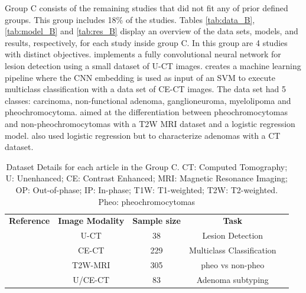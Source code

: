 \documentclass{article}
\begin{document}
Group C consists of the remaining studies that did not fit any of prior defined
groups.  This group includes 18\% of the studies. Tables \ref{tab:data_B},
\ref{tab:model_B} and \ref{tab:res_B} display an overview of the data sets,
models, and results, respectively, for each study inside group C. In this group
are 4 studies with distinct objectives. \cite{Bi2017} implements a fully
convolutional neural network for lesion detection using a small dataset of U-CT
images. \cite{Bi2022} creates a machine learning pipeline where the CNN
embedding is used as input of an SVM to execute multiclass classification with a
data set of CE-CT images. The data set had 5 classes: carcinoma, non-functional
adenoma, ganglioneuroma, myelolipoma and pheochromocytoma.\cite{Kong2022} aimed
at the differentiation between pheochromocytomas and non-pheochromocytomas with
a T2W MRI dataset and a logistic regression model. \cite{Zheng2020} also used
logistic regression but to characterize adenomas with a CT dataset.
\begin{table}[]
    \centering
    \begin{tabular}{ccccc}\toprule
        \multirow{2}{*}{\textbf{Reference}} & \multirow{2}{*}{\textbf{Image Modality}} & \multirow{2}{*}{\textbf{Sample size}} & \multirow{2}{*}{\textbf{Task}} \\
        \\ \midrule
        \cite{Bi2017}                       & U-CT                                     & 38                                    & Lesion Detection               \\
        \cite{Bi2022}                       & CE-CT                                    & 229                                   & Multiclass Classification      \\
        \cite{Kong2022}                     & T2W-MRI                                  & 305                                   & pheo vs non-pheo               \\
        \cite{Zheng2020}                    & U/CE-CT                                  & 83                                    & Adenoma subtyping              \\
        \bottomrule
    \end{tabular}
    \caption{Dataset Details for each article in the Group C. CT: Computed Tomography; U: Unenhanced; CE: Contrast Enhanced; MRI: Magnetic Resonance Imaging; OP: Out-of-phase; IP: In-phase; T1W: T1-weighted; T2W: T2-weighted. Pheo: pheochromocytomas}
    \label{tab:data_C}
\end{table}
\end{document}
